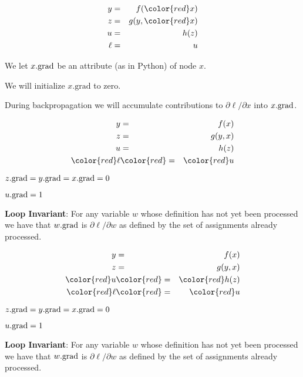 {
\vspace{-3ex}
\begin{eqnarray*}
  y & = & f({\color{red} x}) \\
  z & = & g(y,{\color{red} x}) \\
  u & = & h(z) \\
  \ell &  = &  u
\end{eqnarray*}

\medskip
We let {\color{red} $x.\mathrm{grad}$} be an attribute (as in Python) of node {\color{red} $x$}.

\bigskip
\bigskip
We will initialize {\color{red} $x.\mathrm{grad}$} to zero.

\bigskip
\bigskip
During backpropagation we will accumulate contributions to {\color{red} ${\partial \ell}/{\partial x}$} into {\color{red} $x.\mathrm{grad}$}.


\vspace{-3ex}
\begin{eqnarray*}
  y & = & f(x) \\
  z & = & g(y,x) \\
  u & = & h(z) \\
  {\color{red} \ell} &  {\color{red} =} & {\color{red}  u}
\end{eqnarray*}


\medskip
$z.\mathrm{grad} = y.\mathrm{grad} = x.\mathrm{grad} = 0$

\medskip
$u.\mathrm{grad} = 1$

\medskip
{\bf Loop Invariant}: For any variable $w$ whose definition has not yet been processed we have that $w.\mathrm{grad}$ is $\partial \ell/\partial w$ as defined by the set of assignments already processed.

\vspace{-3ex}
\begin{eqnarray*}
  y & = & f(x) \\
  z & = & g(y,x) \\
  {\color{red} u} & {\color{red} =} & {\color{red} h(z)} \\
  {\color{red} \ell} & {\color{red}  =} &  {\color{red} u}
\end{eqnarray*}

\medskip
$z.\mathrm{grad} = y.\mathrm{grad} = x.\mathrm{grad} = 0$

\medskip
$u.\mathrm{grad} = 1$

\medskip
{\bf Loop Invariant}: For any variable $w$ whose definition has not yet been processed we have that $w.\mathrm{grad}$ is $\partial \ell/\partial w$ as defined by the set of assignments already processed.

}
